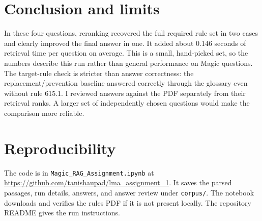 \documentclass[11pt,a4paper]{article}
\begin{document}
\section*{Conclusion and limits}
In these four questions, reranking recovered the full required rule set in two cases and clearly improved the final answer in one. It added about 0.146 seconds of retrieval time per question on average. This is a small, hand-picked set, so the numbers describe this run rather than general performance on Magic questions. The target-rule check is stricter than answer correctness: the replacement/prevention baseline answered correctly through the glossary even without rule 615.1. I reviewed answers against the PDF separately from their retrieval ranks. A larger set of independently chosen questions would make the comparison more reliable.

\section*{Reproducibility}
The code is in \texttt{Magic\_RAG\_Assignment.ipynb} at \url{https://github.com/tanishaupad/lma_assignment_1}. It saves the parsed passages, run details, answers, and answer review under \texttt{corpus/}. The notebook downloads and verifies the rules PDF if it is not present locally. The repository README gives the run instructions.
\end{document}
